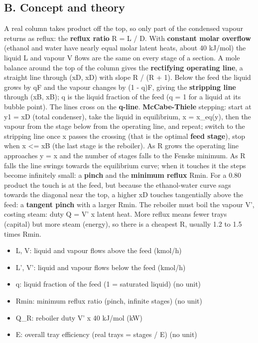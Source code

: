 \documentclass[11pt,a4paper]{article}
\begin{document}
\subsection*{B. Concept and theory}
A real column takes product off the top, so only part of the condensed vapour returns as reflux: the \textbf{reflux ratio} R = L / D. With \textbf{constant molar overflow} (ethanol and water have nearly equal molar latent heats, about 40 kJ/mol) the liquid L and vapour V flows are the same on every stage of a section. A mole balance around the top of the column gives the \textbf{rectifying operating line}, a straight line through (xD, xD) with slope R / (R + 1). Below the feed the liquid grows by qF and the vapour changes by (1 - q)F, giving the \textbf{stripping line} through (xB, xB); q is the liquid fraction of the feed (q = 1 for a liquid at its bubble point). The lines cross on the \textbf{q-line}. \textbf{McCabe-Thiele} stepping: start at y1 = xD (total condenser), take the liquid in equilibrium, x = x\_eq(y), then the vapour from the stage below from the operating line, and repeat; switch to the stripping line once x passes the crossing (that is the optimal \textbf{feed stage}), stop when x <= xB (the last stage is the reboiler). As R grows the operating line approaches y = x and the number of stages falls to the Fenske minimum. As R falls the line swings towards the equilibrium curve; when it touches it the steps become infinitely small: a \textbf{pinch} and the \textbf{minimum reflux} Rmin. For a 0.80 product the touch is at the feed, but because the ethanol-water curve sags towards the diagonal near the top, a higher xD touches tangentially above the feed: a \textbf{tangent pinch} with a larger Rmin. The reboiler must boil the vapour V', costing steam: duty Q = V' x latent heat. More reflux means fewer trays (capital) but more steam (energy), so there is a cheapest R, usually 1.2 to 1.5 times Rmin.

\begin{itemize}[nosep]
\item L, V: liquid and vapour flows above the feed (kmol/h)
\item L', V': liquid and vapour flows below the feed (kmol/h)
\item q: liquid fraction of the feed (1 = saturated liquid) (no unit)
\item Rmin: minimum reflux ratio (pinch, infinite stages) (no unit)
\item Q\_R: reboiler duty V' x 40 kJ/mol (kW)
\item E: overall tray efficiency (real trays = stages / E) (no unit)
\end{itemize}
\end{document}
